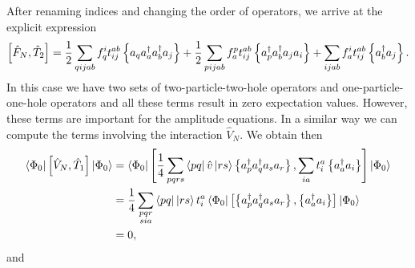     After renaming indices and changing the order of operators, we arrive at the explicit expression
    \[
        \left[ \hat{F}_N, \hat{T}_2 \right]
        = \frac{1}{2} \sum_{qijab} f_q^i t_{ij}^{ab} \left\{a_q a^\dagger_a a^\dagger_b a_j\right\}
        + \frac{1}{2} \sum_{pijab} f_a^p t_{ij}^{ab} \left\{a^\dagger_p a^\dagger_b a_j a_i\right\}+ \sum_{ijab} f_a^i t_{ij}^{ab} \left\{a^\dagger_b a_j\right\}. 
    \]
In this case we have two sets of two-particle-two-hole operators and one-particle-one-hole operators and all these terms result in zero expectation values. 
However, these terms are important for the amplitude equations.  
In a similar way we can compute the terms involving the interaction $\hat{V}_N$.  
We obtain then
    \begin{align*}
        \bra{\Phi_0} \left[ \hat{V}_N, \hat{T}_1 \right] \ket{\Phi_0} &= 
            \bra{\Phi_0}
                \left[ \frac{1}{4} \sum_{pqrs} \bra{pq}\hat{v}\ket{rs} \left\{a^\dagger_p a^\dagger_q a_s  a_r\right\},
                    \sum_{ia} t_i^a \left\{a^\dagger_a a_i\right\} \right] \ket{\Phi_0} \\ 
            &= \frac{1}{4}\sum_{\substack{
                pqr \\
                sia}} \bra{pq}\ket{rs} t_i^a \bra{\Phi_0} 
                \left[ \left\{a^\dagger_p a^\dagger_q a_s  a_r\right\}, \left\{a^\dagger_a a_i\right\} \right]
                \ket{\Phi_0} \\ 
        &= 0,
    \end{align*}
and

